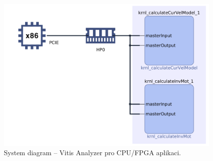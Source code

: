 \documentclass[a4paper, twoside, 11pt]{article}
\begin{document}
	\begin{figure}[htbp!]
		\centering
		\includegraphics[width=1\textwidth]{src/png/vitis-analyzer/rt/keyboard-input-10-values-loop/writing-data-output/rt-system-diagram-crop.png}
		\caption{System diagram – Vitis Analyzer pro CPU/FPGA aplikaci.}
		\label{fig:rt-system-diagram-crop}
	\end{figure}
\end{document}
